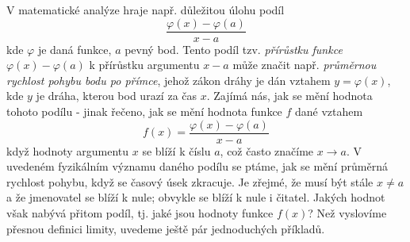     V matematické analýze hraje např. důležitou úlohu podíl \cite[s.~117]{Brabec1989}
    \begin{equation*}
      \dfrac{\varphi(x) - \varphi(a)}{x - a}
    \end{equation*}
    kde \(\varphi\) je daná funkce, \(a\) pevný bod. Tento podíl tzv. \emph{přírůstku funkce} 
    \(\varphi(x) - \varphi(a)\) k přírůstku argumentu \(x - a\) může značit např. \emph{průměrnou 
    rychlost pohybu bodu po přímce}, jehož zákon dráhy je dán vztahem \(y = \varphi(x)\), kde \(y\) 
    je dráha, kterou bod urazí za čas \(x\). Zajímá nás, jak se mění hodnota tohoto podílu - jinak 
    řečeno, jak se mění hodnota funkce \(f\) dané vztahem
    \begin{equation}\label{mai:eq037}
      f(x) = \dfrac{\varphi(x) - \varphi(a)}{x - a}
    \end{equation}
    když hodnoty argumentu \(x\) se blíží k číslu \(a\), což často značíme \(x\rightarrow a\). V 
    uvedeném fyzikálním významu daného podílu se ptáme, jak se mění průměrná rychlost pohybu, když 
    se časový úsek zkracuje. Je zřejmé, že musí být stále \(x \neq a\) a že jmenovatel se blíží k 
    nule; obvykle se blíží k nule i čitatel. Jakých hodnot však nabývá přitom podíl, tj. jaké jsou 
    hodnoty funkce \(f(x)\)? Než vyslovíme přesnou definici limity, uvedeme ještě pár jednoduchých 
    příkladů.

      

